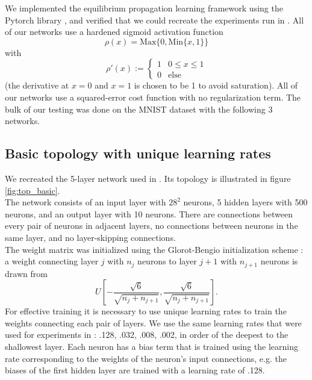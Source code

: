 \documentclass{article}
\newcommand{\npar}{\\\indent}
\begin{document}
We implemented the equilibrium propagation learning framework \cite{scellier17} using the Pytorch library \cite{pytorch}, and verified that we could recreate the experiments run in \cite{scellier17}. All of our networks use a hardened sigmoid activation function 
\begin{equation}
\rho(x)=\text{Max}\{0, \text{Min}\{x, 1\}\}
\end{equation} with 
\begin{equation}\rho'(x):=\begin{cases}1 & 0\leq x \leq 1 \\ 0 & \text{else}\end{cases}\end{equation}
(the derivative at $x=0$ and $x=1$ is chosen to be 1 to avoid saturation). All of our networks use a squared-error cost function with no regularization term. The bulk of our testing was done on the MNIST dataset \cite{mnist1998} with the following 3 networks.

\subsection{Basic topology with unique learning rates}
\label{sec:basic_topology}

We recreated the 5-layer network used in \cite{scellier17}. Its topology is illustrated in figure \ref{fig:top_basic}.
\npar
The network consists of an input layer with $28^2$ neurons, 5 hidden layers with 500 neurons, and an output layer with 10 neurons. There are connections between every pair of neurons in adjacent layers, no connections between neurons in the same layer, and no layer-skipping connections.
\npar
The weight matrix was initialized using the Glorot-Bengio initialization scheme \cite{glorot10}: a weight connecting layer $j$ with $n_j$ neurons to layer $j+1$ with $n_{j+1}$ neurons is drawn from 
\begin{equation}
\label{eqn:gb_init}
U[-\frac{\sqrt{6}}{\sqrt{n_j+n_{j+1}}},\frac{\sqrt{6}}{\sqrt{n_j+n_{j+1}}}].
\end{equation}
For effective training it is necessary to use unique learning rates to train the weights connecting each pair of layers. We use the same learning rates that were used for experiments in \cite{scellier17}: .128, .032, .008, .002, in order of the deepest to the shallowest layer. Each neuron has a bias term that is trained using the learning rate corresponding to the weights of the neuron's input connections, e.g. the biases of the first hidden layer are trained with a learning rate of .128.
\end{document}
